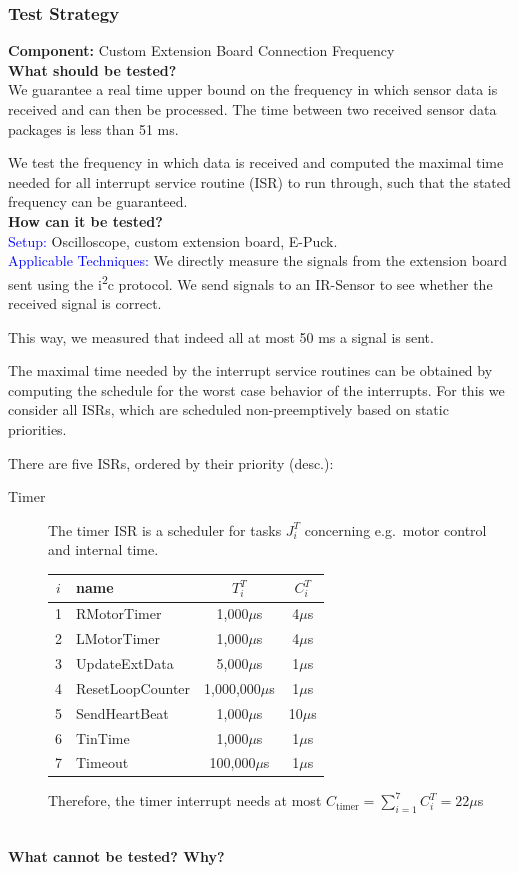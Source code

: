 \documentclass[a4paper,parskip,headheight=38pt]{scrartcl} %
\newcommand{\teststrat}[5]{
    \subsubsection{Test Strategy}
	\textbf{Component:} #1 \\
	\noindent\textbf{What should be tested?} \\
    \noindent #2 \\
	\noindent\textbf{How can it be tested?} \\
    \noindent\textcolor{blue}{Setup:} #3 \\
    \noindent\textcolor{blue}{Applicable Techniques:} #4 \\
	\noindent\textbf{What cannot be tested? Why?} \\
    \noindent #5
}
\newcommand{\mics}{$\mu$s}
\begin{document}
\teststrat{Custom Extension Board Connection Frequency}{
    We guarantee a real time upper bound on the frequency in which sensor data
    is received and can then be processed. The time between two received
    sensor data packages is less than 51 ms.

    We test the frequency in which data is received and computed the maximal
    time needed for all interrupt service routine (ISR) to run through, such
    that the
    stated frequency can be guaranteed.
}{
    Oscilloscope, custom extension board, E-Puck.
}{
    We directly measure the signals from the extension board sent using the
    i\textsuperscript{2}c protocol. We send signals to an IR-Sensor to see
    whether the received signal is correct.

    This way, we measured that indeed all at most 50 ms a signal is sent. 

    The maximal time needed by the interrupt service routines can be obtained by
    computing the schedule for the worst case behavior of the interrupts. For
    this we consider all ISRs, which are scheduled non-preemptively based on
    static priorities.

    There are five ISRs, ordered by their priority (desc.):
    \begin{description}
        \item[Timer] The timer ISR is a scheduler for tasks $J^T_i$ concerning
            e.g.\ motor control and internal time. \\
            \begin{center}
            \begin{tabular}{c | l | c | c}
                $i$ & name & $T^T_i$ & $C^T_i$ \\
                \hline
                1 & RMotorTimer         & 1,000\mics     & 4\mics \\
                2 & LMotorTimer         & 1,000\mics     & 4\mics \\
                3 & UpdateExtData       & 5,000\mics     & 1\mics \\
                4 & ResetLoopCounter    & 1,000,000\mics & 1\mics \\
                5 & SendHeartBeat       & 1,000\mics     & 10\mics \\
                6 & TinTime             & 1,000\mics     & 1\mics \\
                7 & Timeout             & 100,000\mics   & 1\mics \\
            \end{tabular}
            \end{center}
            Therefore, the timer interrupt needs at most $C_{\text{timer}}
            = \sum_{i = 1}^{7}C^T_i = 22$\mics


\end{description}}
\end{document}
